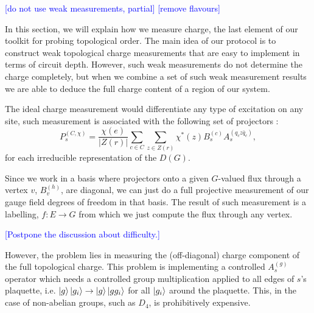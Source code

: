 \documentclass[two column]{article}
\newcommand{\caro}[1]{\textcolor{red}{[#1]}}
\newcommand{\jovan}[1]{\textcolor{blue}{[#1]}}
\begin{document}
\jovan{do not use weak measurements, partial}
\jovan{remove flavours}

In this section, we will explain how we measure charge, the last element of our toolkit for probing topological order. The main idea of our protocol is to construct weak topological charge measurements that are easy to implement in terms of circuit depth. However, such weak measurements do not determine the charge completely, but when we combine a set of such weak measurement results we are able to deduce the full charge content of a region of our system.

The ideal charge measurement would differentiate any type of excitation on any site, such measurement is associated with the following set of projectors \cite{}:
\begin{equation}
    P_s^{(C, \chi)} = \frac{\chi(e)}{|Z(r)|}\sum_{c \in C}\sum_{z \in Z(r)}\chi^*(z)B_s^{(c)}A_s^{(q_c z \bar{q}_c)},
\end{equation}
for each irreducible representation of the $D(G)$.

Since we work in a basis where projectors onto a given $G$-valued flux through a vertex $v$, $B_v^{(h)}$, are diagonal, we can just do a full projective measurement of our gauge field degrees of freedom in that basis. 
The result of such measurement is a labelling, $f: E \rightarrow G$ from which we just compute the flux through any vertex. 

\jovan{Postpone the discussion about difficulty.}

However, the problem lies in measuring the (off-diagonal) charge component of the full topological charge.
This problem is implementing a controlled $A^{(g)}_s$ operator which needs a controlled group multiplication applied to all edges of $s$'s plaquette, i.e. $\ket{g}\ket{g_i} \rightarrow \ket{g}\ket{gg_i}$ for all $\ket{g_i}$ around the plaquette.
This, in the case of non-abelian groups, such as $D_4$, is prohibitively expensive. 


\end{document}
